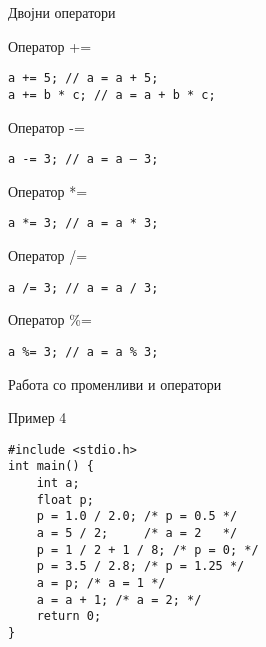 \begin{frame}[fragile,shrink=5]{Двојни оператори}
\begin{block}{Оператор +=}
\begin{verbatim}
a += 5; // a = a + 5;
a += b * c; // a = a + b * c;
\end{verbatim}
\end{block}
\begin{block}{Оператор -=}
\begin{verbatim}
a -= 3; // a = a – 3;
\end{verbatim}
\end{block}
\begin{block}{Оператор *=}
\begin{verbatim}
a *= 3; // a = a * 3;
\end{verbatim}
\end{block}
\begin{block}{Оператор /=}
\begin{verbatim}
a /= 3; // a = a / 3;
\end{verbatim}
\end{block}
\begin{block}{Оператор \%=}
\begin{verbatim}
a %= 3; // a = a % 3;
\end{verbatim}
\end{block}
\end{frame} 

\begin{frame}[fragile]{Работа со променливи и оператори}
    \begin{exampleblock}{Пример 4}
\begin{lstlisting}
#include <stdio.h>  
int main() {
    int a;
    float p;
    p = 1.0 / 2.0; /* p = 0.5 */
    a = 5 / 2;     /* a = 2   */
    p = 1 / 2 + 1 / 8; /* p = 0; */
    p = 3.5 / 2.8; /* p = 1.25 */
    a = p; /* a = 1 */
    a = a + 1; /* a = 2; */
    return 0;       
}
\end{lstlisting}
    \end{exampleblock}
\end{frame}

